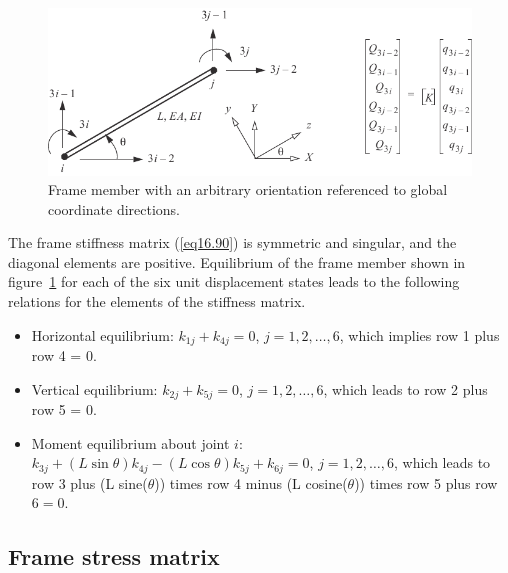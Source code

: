 \documentclass{AeroStructure-ERJohnson}
\begin{document}
\begin{figure}[!h]
\centerline{\includegraphics{Figure_16-23.pdf}}
\caption{Frame member with an arbitrary orientation referenced to global coordinate directions.}\label{fig16.23}
\end{figure}

The frame stiffness matrix (\ref{eq16.90}) is symmetric and singular, and the diagonal elements are positive. Equilibrium of the frame member shown in figure~\ref{fig16.23} for each of the six unit displacement states leads to the following relations for the elements of the stiffness matrix.
\begin{itemize}
\item Horizontal equilibrium: $k_{1 j}+k_{4 j}=0$, $j=1,2, \ldots, 6$, which implies row 1 plus row 4 = 0.

\item Vertical equilibrium: $k_{2 j}+k_{5 j}=0$, $j=1,2, \ldots, 6$, which leads to row 2 plus row 5 = 0.

\item Moment equilibrium about joint $i$: $k_{3 j}+(L \sin \theta) k_{4 j}-(L \cos \theta) k_{5 j}+k_{6 j}=0$, $j=1,2, \ldots, 6$, which leads to row 3 plus (L sine($\theta$)) times row 4 minus (L cosine($\theta$)) times row 5 plus row $6 = 0$.
\end{itemize}

\pagebreak

\subsection{Frame stress matrix}\label{sec16.3.3}
\end{document}
